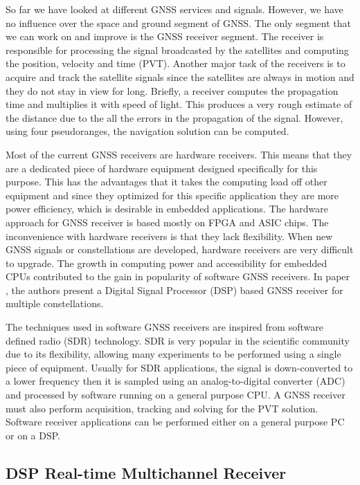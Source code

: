 So far we have looked at different GNSS services and signals. However, we have no influence over the space and ground segment of GNSS. The only segment that we can work on and improve is the GNSS receiver segment. The receiver is responsible for processing the signal broadcasted by the satellites and computing the position, velocity and time (PVT)\cite{receivers}. Another major task of the receivers is to acquire and track the satellite signals since the satellites are always in motion and they do not stay in view for long\cite{receivers}. Briefly, a receiver computes the propagation time and multiplies it with speed of light. This produces a very rough estimate of the distance due to the all the errors in the propagation of the signal. However, using four pseudoranges, the navigation solution can be computed. 

Most of the current GNSS receivers are hardware receivers. This means that they are a dedicated piece of hardware equipment designed specifically for this purpose. This has the advantages that it takes the computing load off other equipment and since they optimized for this specific application they are more power efficiency, which is desirable in embedded applications. The hardware approach for GNSS receiver is based mostly on FPGA and ASIC chips\cite{dspreceiver}. The inconvenience with hardware receivers is that they lack flexibility. When new GNSS signals or constellations are developed, hardware receivers are very difficult to upgrade. The growth in computing power and accessibility for embedded CPUs contributed to the gain in popularity of software GNSS receivers. In paper \cite{dspreceiver}, the authors present a Digital Signal Processor (DSP) based GNSS receiver for multiple constellations.

The techniques used in software GNSS receivers are inspired from software defined radio (SDR) technology. SDR is very popular in the scientific community due to its flexibility, allowing many experiments to be performed using a single piece of equipment. Usually for SDR applications, the signal is down-converted to a lower frequency then it is sampled using an analog-to-digital converter (ADC) and processed by software running on a general purpose CPU. A GNSS receiver must also perform acquisition, tracking and solving for the PVT solution\cite{dspreceiver}. Software receiver applications can be performed either on a general purpose PC or on a DSP. 

\subsection{DSP Real-time Multichannel Receiver\cite{dspreceiver}}
\label{subsec:dsprecv}

